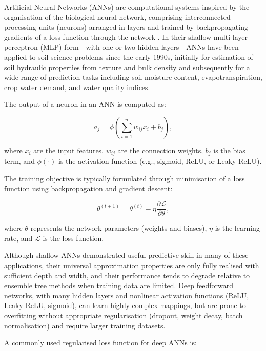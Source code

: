 \documentclass[land,article,submit,pdftex,moreauthors]{Definitions/mdpi}
\numberwithin{equation}{section}
\begin{document}
Artificial Neural Networks (ANNs) are computational systems inspired by the organisation of the biological neural network, comprising interconnected processing units (neurons) arranged in layers and trained by backpropagating gradients of a loss function through the network \citep{goodfellow2016deep}. In their shallow multi-layer perceptron (MLP) form---with one or two hidden layers---ANNs have been applied to soil science problems since the early 1990s, initially for estimation of soil hydraulic properties from texture and bulk density \citep{pachepsky1996developing} and subsequently for a wide range of prediction tasks including soil moisture content, evapotranspiration, crop water demand, and water quality indices.

The output of a neuron in an ANN is computed as:

\begin{equation}
a_j = \phi \left( \sum_{i=1}^{n} w_{ij} x_i + b_j \right),
\end{equation}

where $x_i$ are the input features, $w_{ij}$ are the connection weights, $b_j$ is the bias term, and $\phi(\cdot)$ is the activation function (e.g., sigmoid, ReLU, or Leaky ReLU).

The training objective is typically formulated through minimisation of a loss function using backpropagation and gradient descent:

\begin{equation}
\theta^{(t+1)} =
\theta^{(t)}
-
\eta
\frac{\partial \mathcal{L}}{\partial \theta},
\end{equation}

where $\theta$ represents the network parameters (weights and biases), $\eta$ is the learning rate, and $\mathcal{L}$ is the loss function.

Although shallow ANNs demonstrated useful predictive skill in many of these applications, their universal approximation properties are only fully realised with sufficient depth and width, and their performance tends to degrade relative to ensemble tree methods when training data are limited. Deep feedforward networks, with many hidden layers and nonlinear activation functions (ReLU, Leaky ReLU, sigmoid), can learn highly complex mappings, but are prone to overfitting without appropriate regularisation (dropout, weight decay, batch normalisation) and require larger training datasets.

A commonly used regularised loss function for deep ANNs is:
\end{document}

